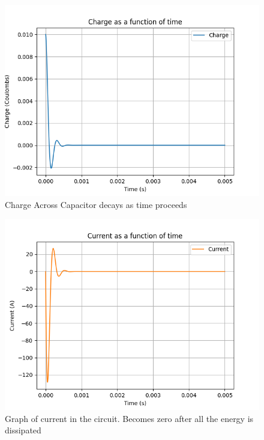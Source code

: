 \documentclass[journal,12pt,twocolumn]{IEEEtran}
\theoremstyle{remark}
\begin{document}
\begin{figure}[H]
    \includegraphics[width=1\columnwidth]{figs/Charge across capacitor during Damping.png}
    \caption{Charge Across Capacitor decays as time proceeds}
    \label{fig:charge_during_damping}
\end{figure}

\begin{figure}[H]
    \includegraphics[width=1\columnwidth]{figs/Current in circuit during damping.png}
    \caption{Graph of current in the circuit. Becomes zero after all the energy is dissipated}
    \label{fig:current_in_damping}
\end{figure}
\end{document}
